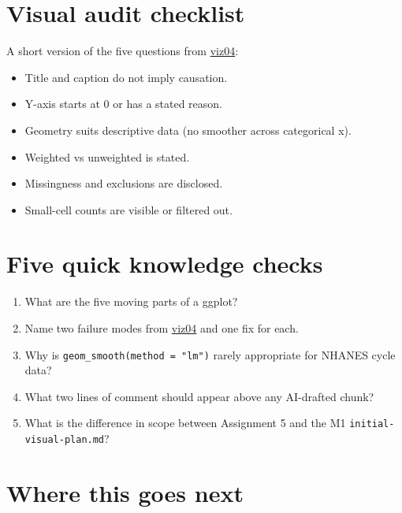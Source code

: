 \documentclass[
  letterpaper,
  DIV=11,
  numbers=noendperiod,
  oneside]{scrreprt}
\providecommand{\tightlist}{%
  \setlength{\itemsep}{0pt}\setlength{\parskip}{0pt}}
\begin{document}
\section*{Visual audit checklist}\label{visual-audit-checklist}


A short version of the five questions from
\hyperref[how-a-plot-can-mislead]{viz04}:

\begin{itemize}
\tightlist
\item
  Title and caption do not imply causation.
\item
  Y-axis starts at 0 or has a stated reason.
\item
  Geometry suits descriptive data (no smoother across categorical x).
\item
  Weighted vs unweighted is stated.
\item
  Missingness and exclusions are disclosed.
\item
  Small-cell counts are visible or filtered out.
\end{itemize}

\section*{Five quick knowledge
checks}\label{five-quick-knowledge-checks}


\begin{enumerate}
\def\labelenumi{\arabic{enumi}.}
\tightlist
\item
  What are the five moving parts of a ggplot?
\item
  Name two failure modes from \hyperref[how-a-plot-can-mislead]{viz04}
  and one fix for each.
\item
  Why is \texttt{geom\_smooth(method\ =\ "lm")} rarely appropriate for
  NHANES cycle data?
\item
  What two lines of comment should appear above any AI-drafted chunk?
\item
  What is the difference in scope between Assignment 5 and the M1
  \texttt{initial-visual-plan.md}?
\end{enumerate}

\section*{Where this goes next}\label{where-this-goes-next-6}
\end{document}
